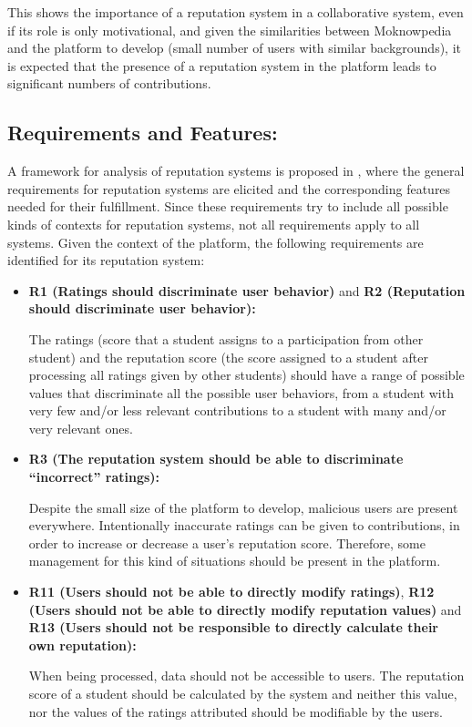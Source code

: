 This shows the importance of a reputation system in a collaborative system, even if its role is only motivational, and given the similarities between Moknowpedia and the platform to develop (small number of users with similar backgrounds), it is expected that the presence of a reputation system in the platform leads to significant numbers of contributions.
	
\subsection{Requirements and Features:}

A framework for analysis of reputation systems is proposed in \cite{vavilis2014reference}, where the general requirements for reputation systems are elicited and the corresponding features needed for their fulfillment. Since these requirements try to include all possible kinds of contexts for reputation systems, not all requirements apply to all systems. Given the context of the platform, the following requirements are identified for its reputation system:

\begin{itemize}
\item  \textbf{R1 (Ratings should discriminate user behavior)} and \textbf{R2 (Reputation should discriminate user behavior): }

The ratings (score that a student assigns to a participation from other student) and the reputation score (the score assigned to a student after processing all ratings given by other students) should have a range of possible values that discriminate all the possible user behaviors, from a student with very few and/or less relevant contributions to a student with many and/or very relevant ones.

\item \textbf{R3 (The reputation system should be able to discriminate ``incorrect'' ratings): }

Despite the small size of the platform to develop, malicious users are present everywhere. Intentionally inaccurate ratings can be given to contributions, in order to increase or decrease a user's reputation score. Therefore, some management for this kind of situations should be present in the platform.

\item \textbf{R11 (Users should not be able to directly modify ratings)}, \textbf{R12 (Users should not be able to directly modify reputation values)} and \textbf{R13 (Users should not be responsible to directly calculate their own reputation): }

When being processed, data should not be accessible to users. The reputation score of a student should be calculated by the system and neither this value, nor the values of the ratings attributed should be modifiable by the users.
\end{itemize}

